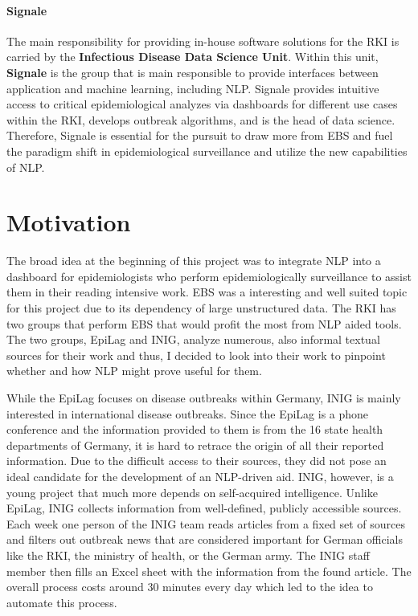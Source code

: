 \paragraph{Signale}
  The main responsibility for providing in-house software solutions for the RKI is carried by the \textbf{Infectious Disease Data Science Unit}.
  Within this unit, \textbf{Signale} is the group that is main responsible to provide interfaces between application and machine learning, including NLP.
  Signale provides intuitive access to critical epidemiological analyzes via dashboards for different use cases within the RKI, develops outbreak algorithms, and is the head of data science.
  Therefore, Signale is essential for the pursuit to draw more from EBS and fuel the paradigm shift in epidemiological surveillance and utilize the new capabilities of NLP.


\section{Motivation}
  The broad idea at the beginning of this project was to integrate NLP into a dashboard for epidemiologists who perform epidemiologically surveillance to assist them in their reading intensive work.
  EBS was a interesting and well suited topic for this project due to its dependency of large unstructured data.
  The RKI has two groups that perform EBS that would profit the most from NLP aided tools. The two groups, EpiLag and INIG, analyze numerous, also informal textual sources for their work and thus, I decided to look into their work to pinpoint whether and how NLP might prove useful for them.

  While the EpiLag focuses on disease outbreaks within Germany, INIG is mainly interested in international disease outbreaks. Since the EpiLag is a phone conference and the information provided to them is from the 16 state health departments of Germany, it is hard to retrace the origin of all their reported information.
  Due to the difficult access to their sources, they did not pose an ideal candidate for the development of an NLP-driven aid.
  INIG, however, is a young project that much more depends on self-acquired intelligence.
  Unlike EpiLag, INIG collects information from well-defined, publicly accessible sources.
  Each week one person of the INIG team reads articles from a fixed set of sources and filters out outbreak news that are considered important for German officials like the RKI, the ministry of health, or the German army.
  The INIG staff member then fills an Excel sheet with the information from the found article.
  The overall process costs around 30 minutes every day which led to the idea to automate this process.


